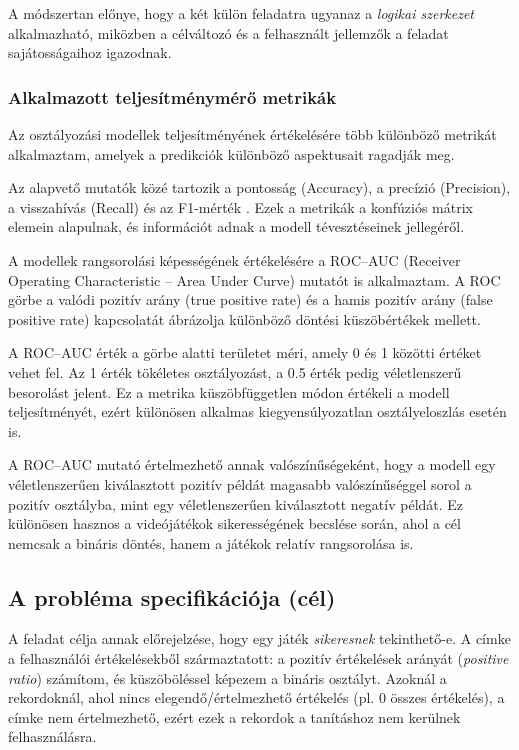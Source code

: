 A módszertan előnye, hogy a két külön feladatra ugyanaz a \textit{logikai szerkezet} alkalmazható,
miközben a célváltozó és a felhasznált jellemzők a feladat sajátosságaihoz igazodnak.

\subsubsection{Alkalmazott teljesítménymérő metrikák}

Az osztályozási modellek teljesítményének értékelésére több különböző
metrikát alkalmaztam, amelyek a predikciók különböző aspektusait
ragadják meg.

Az alapvető mutatók közé tartozik a pontosság (Accuracy),
a precízió (Precision), a visszahívás (Recall) és az F1-mérték  \cite{metrics}.
Ezek a metrikák a konfúziós mátrix elemein alapulnak,
és információt adnak a modell tévesztéseinek jellegéről.

A modellek rangsorolási képességének értékelésére a
ROC--AUC (Receiver Operating Characteristic – Area Under Curve) \cite{roc-auc}
mutatót is alkalmaztam.
A ROC görbe a valódi pozitív arány (true positive rate)
és a hamis pozitív arány (false positive rate) kapcsolatát ábrázolja
különböző döntési küszöbértékek mellett.

A ROC--AUC érték a görbe alatti területet méri,
amely 0 és 1 közötti értéket vehet fel.
Az 1 érték tökéletes osztályozást,
a 0.5 érték pedig véletlenszerű besorolást jelent.
Ez a metrika küszöbfüggetlen módon értékeli a modell teljesítményét,
ezért különösen alkalmas kiegyensúlyozatlan osztályeloszlás esetén is.

A ROC--AUC mutató értelmezhető annak valószínűségeként,
hogy a modell egy véletlenszerűen kiválasztott pozitív példát
magasabb valószínűséggel sorol a pozitív osztályba,
mint egy véletlenszerűen kiválasztott negatív példát.
Ez különösen hasznos a videójátékok sikerességének becslése során,
ahol a cél nemcsak a bináris döntés,
hanem a játékok relatív rangsorolása is.


\subsection{A probléma specifikációja (cél)}
A feladat célja annak előrejelzése, hogy egy játék \textit{sikeresnek} tekinthető-e.
A címke a felhasználói értékelésekből származtatott: a pozitív értékelések arányát
(\textit{positive ratio}) számítom, és küszöböléssel képezem a bináris osztályt.
Azoknál a rekordoknál, ahol nincs elegendő/értelmezhető értékelés (pl. 0 összes értékelés),
a címke nem értelmezhető, ezért ezek a rekordok a tanításhoz nem kerülnek felhasználásra.

